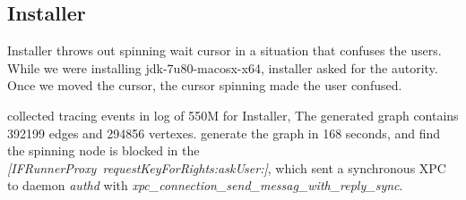 \subsection{Installer}
Installer throws out spinning wait cursor in a situation
that confuses the users.
While we were installing jdk-7u80-macosx-x64, installer
asked for the autority.
Once we moved the cursor, the cursor spinning made the user
confused. 

\xxx collected tracing events in log of 550M for Installer,
The generated graph contains 392199 edges and 294856 vertexes.
\xxx generate the graph in 168 seconds, and find the spinning
node is blocked in the \textit{[IFRunnerProxy\ requestKeyForRights:askUser:]},
which sent a synchronous XPC to daemon \textit{authd} with
\textit{xpc\_connection\_send\_messag\_with\_reply\_sync}.
